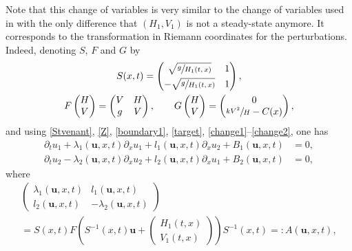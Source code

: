 \documentclass[11pt]{article}
\numberwithin{equation}{section}
\theoremstyle{definition}
\begin{document}
Note that this change of variables is very similar to the change of variables used in \hbox{\cite{BastinCoron22,HS}} with the only difference that $(H_{1},V_{1})$ is not a steady-state anymore.
It corresponds to the transformation in Riemann coordinates for the perturbations.
Indeed, denoting $S$, $F$ and $G$ by
\begin{gather}
S(x,t)=\begin{pmatrix}\sqrt{\sfrac{g}{H_{1}(t,x)}} & 1\\[3pt]
-\sqrt{\sfrac{g}{H_{1}(t,x)}} & 1\end{pmatrix},
\label{defS}\\
F\begin{pmatrix}H\\V\end{pmatrix}=\begin{pmatrix}
V & H\\
g & V
\end{pmatrix},
\label{defF}\qquad
G\begin{pmatrix}H\\V\end{pmatrix}=\begin{pmatrix}0\\\sfrac{kV^{2}}{H}-C(x)\end{pmatrix},
\end{gather}
and using \eqref{Stvenant}, \eqref{Z}, \eqref{boundary1}, \eqref{target}, \eqref{change1}--\eqref{change2}, one has
\begin{equation}
\label{sys1}
\begin{split}
\partial_{t}u_{1}+\lambda_{1}(\boldsymbol{u},x,t)\partial_{x}u_{1}+l_{1}(\boldsymbol{u},x,t)\partial_{x}u_{2}+B_{1}(\boldsymbol{u},x,t)&=0,\\
\partial_{t}{u_{2}}-\lambda_{2}(\boldsymbol{u},x,t)\partial_{x}u_{2}+l_{2}(\boldsymbol{u},x,t)\partial_{x}u_{1}+B_{2}(\boldsymbol{u},x,t)&=0,
\end{split}
\end{equation}
where\vspace*{-5pt}
\begin{multline}
\label{defA}
\begin{pmatrix}\lambda_{1}(\boldsymbol{u},x,t) & l_{1}(\boldsymbol{u},x,t)\\l_{2}(\boldsymbol{u},x,t) & -\lambda_{2}(\boldsymbol{u},x,t)\end{pmatrix}\\[-5pt]
=S(x,t)F\left(S^{-1}(x,t)\boldsymbol{u}+\begin{pmatrix}H_{1}(t,x)\\V_{1}(t,x)\end{pmatrix}\right)S^{-1}(x,t)=:A(\boldsymbol{u},x,t),
\end{multline}
\end{document}
